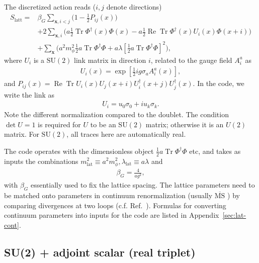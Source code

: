 \documentclass[11pt,a4paper]{article}
\newcommand\RE{\operatorname{Re}}
\newcommand\Tr{\operatorname{Tr}}
\newcommand\MSbar{$\overline{\text{MS}}$ } %
\newcommand\he[1]{#1^\dagger}%
\newcommand\gr[1]{\mathrm{#1}}%
\begin{document}
The discretized action reads ($i,j$ denote directions)
\begin{align}
\label{eq:action_higgs}
S_\text{latt} =& \beta_G \sum_{\textbf{x}, i<j} \Big(1-\frac12 P_{ij}(x)\Big) \nonumber \\ 
 &+2 \sum_{\textbf{x},i} \Big( a \frac12  \Tr \he\Phi(x)\Phi(x) - a \frac12 \RE \Tr \he\Phi(x) U_i(x)\Phi(x+i) \Big) \nonumber \\
& + \sum_\textbf{x} \bigg( a^2 m_\phi^2 \frac12 a \Tr \he\Phi\Phi + a \lambda \left[\frac12 a \Tr \he\Phi\Phi\right]^2\bigg),
\end{align}
where $U_i$ is a $\gr{SU(2)}$ link matrix in direction $i$, related to the gauge field $A_i^a$ as 
\begin{align}
U_i(x) = \exp \left[\frac12 i g \sigma_a A_i^a(x) \right], 
\end{align}
and $P_{ij}(x) = \RE \Tr U_i(x) U_j(x+i) \he U_i(x+j) \he U_j(x)$. In the code, we write the link as 
\begin{align}
U_i = u_0 \sigma_0 + i u_k \sigma_k.
\end{align}
Note the different normalization compared to the doublet. The condition $\det U = 1$ is required for $U$ to be an $\gr{SU(2)}$ matrix; otherwise it is an $U(2)$ matrix. For $\gr{SU(2)}$, all traces here are automatically real.

The code operates with the dimensionless object $\frac12 a \Tr \he\Phi\Phi$ etc, and takes as inputs the combinations $m^2_\text{lat} \equiv a^2 m^2_\phi, \lambda_\text{lat} \equiv a \lambda$ and 
\begin{align}
\beta_G = \frac{4}{a g^2},
\end{align}
with $\beta_G$ essentially used to fix the lattice spacing. The lattice parameters need to be matched onto parameters in continuum renormalization (usually \MSbar) by comparing divergences at two loops (c.f. Ref.~\cite{Laine:1995np}). Formulas for converting continuum parameters into inputs for the code are listed in Appendix~\ref{sec:lat-cont}.



\subsection{SU(2) + adjoint scalar (real triplet)}
\end{document}
